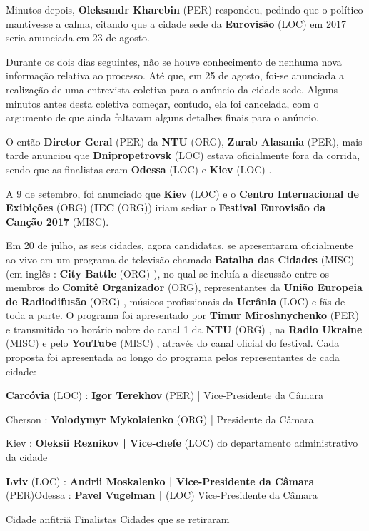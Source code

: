 \documentclass[12pt,a4paper]{article}
\begin{document}
Minutos depois, \textbf{Oleksandr Kharebin} (PER) respondeu, pedindo que o político mantivesse a calma, citando que a cidade sede da \textbf{Eurovisão} (LOC) em 2017 seria anunciada em 23 de agosto.

Durante os dois dias seguintes, não se houve conhecimento de nenhuma nova informação relativa ao processo. Até que, em 25 de agosto, foi-se anunciada a realização de uma entrevista coletiva para o anúncio da cidade-sede. Alguns minutos antes desta coletiva começar, contudo, ela foi cancelada, com o argumento de que ainda faltavam alguns detalhes finais para o anúncio.

O então \textbf{Diretor Geral} (PER) da \textbf{NTU} (ORG), \textbf{Zurab Alasania} (PER), mais tarde anunciou que \textbf{Dnipropetrovsk} (LOC) estava oficialmente fora da corrida, sendo que as finalistas eram \textbf{Odessa} (LOC) e \textbf{Kiev} (LOC) .

A 9 de setembro, foi anunciado que \textbf{Kiev} (LOC) e o \textbf{Centro Internacional de Exibições} (ORG) (\textbf{IEC} (ORG)) iriam sediar o \textbf{Festival Eurovisão da Canção 2017} (MISC).

Em 20 de julho, as seis cidades, agora candidatas, se apresentaram oficialmente ao vivo em um programa de televisão chamado \textbf{Batalha das Cidades} (MISC) (em inglês : \textbf{City Battle} (ORG) ), no qual se incluía a discussão entre os membros do \textbf{Comitê Organizador} (ORG), representantes da \textbf{União Europeia de Radiodifusão} (ORG) , músicos profissionais da \textbf{Ucrânia} (LOC) e fãs de toda a parte. O programa foi apresentado por \textbf{Timur Miroshnychenko} (PER) e transmitido no horário nobre do canal 1 da \textbf{NTU} (ORG) , na \textbf{Radio Ukraine} (MISC) e pelo \textbf{YouTube} (MISC) , através do canal oficial do festival. Cada proposta foi apresentada ao longo do programa pelos representantes de cada cidade:

\textbf{Carcóvia} (LOC) : \textbf{Igor Terekhov} (PER) | Vice-Presidente da Câmara

Cherson : \textbf{Volodymyr Mykolaienko} (ORG) | Presidente da Câmara

Kiev : \textbf{Oleksii Reznikov | Vice-chefe} (LOC) do departamento administrativo da cidade

\textbf{Lviv} (LOC) : \textbf{Andrii Moskalenko | Vice-Presidente da Câmara} (PER)Odessa : \textbf{Pavel Vugelman |} (LOC) Vice-Presidente da Câmara

 Cidade anfitriã  Finalistas  Cidades que se retiraram
\end{document}
